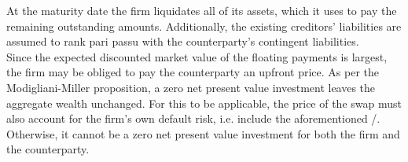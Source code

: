 \documentclass[main.tex]{subfiles}
\begin{document}
        At the maturity date the firm liquidates all of its assets,
        which it uses to pay the remaining outstanding amounts.
        Additionally, the existing creditors' liabilities are assumed to rank pari passu with the counterparty's contingent liabilities.
        \\
        Since the expected discounted market value of the floating payments is largest,
        the firm may be obliged to pay the counterparty an upfront price.
        As per the Modigliani-Miller proposition, 
        a zero net present value investment leaves the aggregate wealth unchanged.
        For this to be applicable, the price of the swap must also account for the firm's own default risk,
        i.e. include the aforementioned \DVA/.
        Otherwise, it cannot be a zero net present value investment for both the firm and the counterparty.
\end{document}

